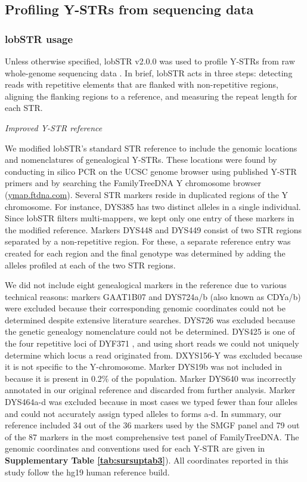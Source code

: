 \subsection{Profiling Y-STRs from sequencing data}
\subsubsection{lobSTR usage}
Unless otherwise specified, lobSTR v2.0.0 was used to profile Y-STRs from raw whole-genome sequencing data \cite{GymrekGolanRossetEtAl2012}. In brief, lobSTR acts in three steps: detecting reads with repetitive elements that are flanked with non-repetitive regions, aligning the flanking regions to a reference, and measuring the repeat length for each STR. 

\emph{Improved Y-STR reference}

We modified lobSTR's standard STR reference to include the genomic locations and nomenclatures of genealogical Y-STRs. These locations were found by conducting in silico PCR on the UCSC genome browser using published Y-STR primers \cite{KayserKittlerErlerEtAl2004,BoschLeeCalafellEtAl2002,ButlerDeckerValloneEtAl2006,HansonBerdosBallantyne2006,LimXueParkinEtAl2007,LeatEhrenreichBenjeddouEtAl2007,MalaspinaCiminelliViggianoEtAl1997,SchoskeValloneKlineEtAl2004,JoblingSamaraPandyaEtAl1996} and by searching the FamilyTreeDNA Y chromosome browser (\url{ymap.ftdna.com}). Several STR markers reside in duplicated regions of the Y chromosome. For instance, DYS385 has two distinct alleles in a single individual. Since lobSTR filters multi-mappers, we kept only one entry of these markers in the modified reference. Markers DYS448 and DYS449 consist of two STR regions separated by a non-repetitive region. For these, a separate reference entry was created for each region and the final genotype was determined by adding the alleles profiled at each of the two STR regions. 

We did not include eight genealogical markers in the reference due to various technical reasons: markers GAAT1B07 and DYS724a/b (also known as CDYa/b) were excluded because their corresponding genomic coordinates could not be determined despite extensive literature searches.  DYS726 was excluded because the genetic genealogy nomenclature could not be determined. DYS425 is one of the four repetitive loci of DYF371 \cite{JoblingSamaraPandyaEtAl1996}, and using short reads we could not uniquely determine which locus a read originated from. DXYS156-Y was excluded because it is not specific to the Y-chromosome. Marker DYS19b was not included in because it is present in 0.2\% of the population. Marker DYS640 was incorrectly annotated in our original reference and discarded from further analysis. Marker DYS464a-d was excluded because in most cases we typed fewer than four alleles and could not accurately assign typed alleles to forms a-d.  In summary, our reference included 34 out of the 36 markers used by the SMGF panel and 79 out of the 87 markers in the most comprehensive test panel of FamilyTreeDNA. The genomic coordinates and conventions used for each Y-STR are given in \textbf{Supplementary Table \ref{tab:sursuptab3}}). All coordinates reported in this study follow the hg19 human reference build.

